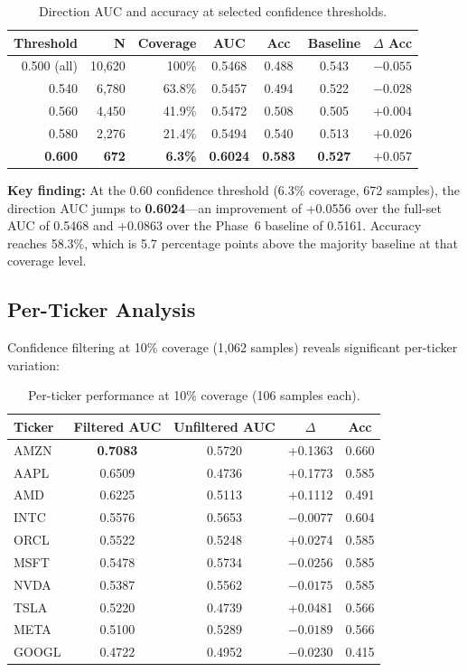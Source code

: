 \documentclass[12pt,a4paper]{article}
\begin{document}
\begin{table}[H]
\centering
\caption{Direction AUC and accuracy at selected confidence thresholds.}
\begin{tabular}{rrrcccc}
\toprule
\textbf{Threshold} & \textbf{N} & \textbf{Coverage} & \textbf{AUC} & \textbf{Acc} & \textbf{Baseline} & \textbf{$\Delta$ Acc} \\
\midrule
0.500 (all) & 10,620 & 100\% & 0.5468 & 0.488 & 0.543 & $-0.055$ \\
0.540       & 6,780  & 63.8\% & 0.5457 & 0.494 & 0.522 & $-0.028$ \\
0.560       & 4,450  & 41.9\% & 0.5472 & 0.508 & 0.505 & $+0.004$ \\
0.580       & 2,276  & 21.4\% & 0.5494 & 0.540 & 0.513 & $+0.026$ \\
\textbf{0.600} & \textbf{672} & \textbf{6.3\%} & \textbf{0.6024} & \textbf{0.583} & \textbf{0.527} & $\mathbf{+0.057}$ \\
\bottomrule
\end{tabular}
\end{table}

\noindent\textbf{Key finding:} At the 0.60 confidence threshold (6.3\% coverage, 672 samples), the direction AUC jumps to \textbf{0.6024}---an improvement of +0.0556 over the full-set AUC of 0.5468 and +0.0863 over the Phase~6 baseline of 0.5161. Accuracy reaches 58.3\%, which is 5.7 percentage points above the majority baseline at that coverage level.

\subsection{Per-Ticker Analysis}

Confidence filtering at 10\% coverage (1,062 samples) reveals significant per-ticker variation:

\begin{table}[H]
\centering
\caption{Per-ticker performance at 10\% coverage (106 samples each).}
\begin{tabular}{lcccc}
\toprule
\textbf{Ticker} & \textbf{Filtered AUC} & \textbf{Unfiltered AUC} & \textbf{$\Delta$} & \textbf{Acc} \\
\midrule
AMZN  & \textbf{0.7083} & 0.5720 & +0.1363 & 0.660 \\
AAPL  & 0.6509 & 0.4736 & +0.1773 & 0.585 \\
AMD   & 0.6225 & 0.5113 & +0.1112 & 0.491 \\
INTC  & 0.5576 & 0.5653 & $-0.0077$ & 0.604 \\
ORCL  & 0.5522 & 0.5248 & +0.0274 & 0.585 \\
MSFT  & 0.5478 & 0.5734 & $-0.0256$ & 0.585 \\
NVDA  & 0.5387 & 0.5562 & $-0.0175$ & 0.585 \\
TSLA  & 0.5220 & 0.4739 & +0.0481 & 0.566 \\
META  & 0.5100 & 0.5289 & $-0.0189$ & 0.566 \\
GOOGL & 0.4722 & 0.4952 & $-0.0230$ & 0.415 \\
\bottomrule
\end{tabular}
\end{table}
\end{document}
